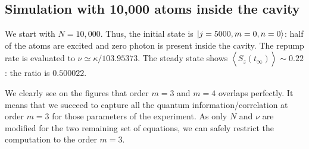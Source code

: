 \documentclass[11pt]{report}
\DeclarePairedDelimiter\ket{\lvert}{\rangle}
\begin{document}
\pagebreak
\subsection{Simulation with 10,000 atoms inside the cavity}

We start with $N=10,000$. Thus, the initial state is $\ket{j=5000, m=0, n=0}$: half of the atoms are excited and zero photon is present inside the cavity. The repump rate is evaluated to $\nu \simeq \kappa / 103.95373$. The steady state shows $\left\langle \hat{S}_z(t_\infty) \right\rangle \sim 0.22$: the ratio is $0.500022$.

We clearly see on the figures that order $m=3$ and $m=4$ overlaps perfectly. It means that we succeed to capture all the quantum information/correlation at order $m=3$ for those parameters of the experiment. As only $N$ and $\nu$ are modified for the two remaining set of equations, we can safely restrict the computation to the order $m=3$.
\end{document}
